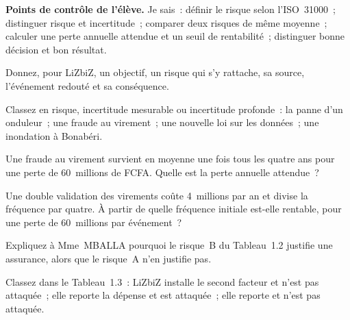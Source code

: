 \begin{boxinfo}
\textbf{Points de contrôle de l'élève.} Je sais~: définir le risque selon
l'ISO~31000~; distinguer risque et incertitude~; comparer deux risques de
même moyenne~; calculer une perte annuelle attendue et un seuil de
rentabilité~; distinguer bonne décision et bon résultat.
\end{boxinfo}

\bigskip

\begin{boxexo}[title={\ding{45}\quad Exercice~1.1. Définir \niveaubase}]
Donnez, pour LiZbiZ, un objectif, un risque qui s'y rattache, sa source,
l'événement redouté et sa conséquence.
\end{boxexo}

\begin{boxexo}[title={\ding{45}\quad Exercice~1.2. Knight \niveaubase}]
Classez en risque, incertitude mesurable ou incertitude profonde~: la
panne d'un onduleur~; une fraude au virement~; une nouvelle loi sur les
données~; une inondation à Bonabéri.
\end{boxexo}

\begin{boxexo}[title={\ding{45}\quad Exercice~1.3. Calculer \niveaubase}]
Une fraude au virement survient en moyenne une fois tous les quatre ans
pour une perte de 60~millions de FCFA. Quelle est la perte annuelle
attendue~?
\end{boxexo}

\begin{boxexo}[title={\ding{45}\quad Exercice~1.4. Le seuil \niveaumoyen}]
Une double validation des virements coûte 4~millions par an et divise la
fréquence par quatre. À partir de quelle fréquence initiale est-elle
rentable, pour une perte de 60~millions par événement~?
\end{boxexo}

\begin{boxexo}[title={\ding{45}\quad Exercice~1.5. La queue \niveaumoyen}]
Expliquez à Mme~MBALLA pourquoi le risque~B du Tableau~1.2 justifie une
assurance, alors que le risque~A n'en justifie pas.
\end{boxexo}

\begin{boxexo}[title={\ding{45}\quad Exercice~1.6. Décision ou chance \niveaumoyen}]
Classez dans le Tableau~1.3~: LiZbiZ installe le second facteur et n'est
pas attaquée~; elle reporte la dépense et est attaquée~; elle reporte et
n'est pas attaquée.
\end{boxexo}

